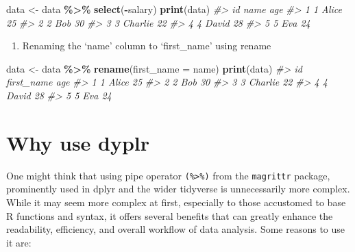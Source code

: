 \documentclass[
]{book}
\newenvironment{Shaded}{\begin{snugshade}}{\end{snugshade}}
\newcommand{\AttributeTok}[1]{\textcolor[rgb]{0.13,0.29,0.53}{#1}}
\newcommand{\CommentTok}[1]{\textcolor[rgb]{0.56,0.35,0.01}{\textit{#1}}}
\newcommand{\FunctionTok}[1]{\textcolor[rgb]{0.13,0.29,0.53}{\textbf{#1}}}
\newcommand{\NormalTok}[1]{#1}
\newcommand{\OtherTok}[1]{\textcolor[rgb]{0.56,0.35,0.01}{#1}}
\newcommand{\SpecialCharTok}[1]{\textcolor[rgb]{0.81,0.36,0.00}{\textbf{#1}}}
\providecommand{\tightlist}{%
  \setlength{\itemsep}{0pt}\setlength{\parskip}{0pt}}
\begin{document}
\begin{Shaded}
\begin{Highlighting}[]
\NormalTok{data }\OtherTok{\textless{}{-}}\NormalTok{ data }\SpecialCharTok{\%\textgreater{}\%}
  \FunctionTok{select}\NormalTok{(}\SpecialCharTok{{-}}\NormalTok{salary)}
\FunctionTok{print}\NormalTok{(data)}
\CommentTok{\#\textgreater{}   id    name age}
\CommentTok{\#\textgreater{} 1  1   Alice  25}
\CommentTok{\#\textgreater{} 2  2     Bob  30}
\CommentTok{\#\textgreater{} 3  3 Charlie  22}
\CommentTok{\#\textgreater{} 4  4   David  28}
\CommentTok{\#\textgreater{} 5  5     Eva  24}
\end{Highlighting}
\end{Shaded}

\begin{enumerate}
\def\labelenumi{\arabic{enumi}.}
\setcounter{enumi}{2}
\tightlist
\item
  Renaming the `name' column to `first\_name' using rename
\end{enumerate}

\begin{Shaded}
\begin{Highlighting}[]
\NormalTok{data }\OtherTok{\textless{}{-}}\NormalTok{ data }\SpecialCharTok{\%\textgreater{}\%}
  \FunctionTok{rename}\NormalTok{(}\AttributeTok{first\_name =}\NormalTok{ name)}
\FunctionTok{print}\NormalTok{(data)}
\CommentTok{\#\textgreater{}   id first\_name age}
\CommentTok{\#\textgreater{} 1  1      Alice  25}
\CommentTok{\#\textgreater{} 2  2        Bob  30}
\CommentTok{\#\textgreater{} 3  3    Charlie  22}
\CommentTok{\#\textgreater{} 4  4      David  28}
\CommentTok{\#\textgreater{} 5  5        Eva  24}
\end{Highlighting}
\end{Shaded}

\section*{Why use dyplr}\label{why-use-dyplr}

One might think that using pipe operator \texttt{(\%\textgreater{}\%)} from the \texttt{magrittr} package, prominently used in dplyr and the wider tidyverse is unnecessarily more complex. While it may seem more complex at first, especially to those accustomed to base R functions and syntax, it offers several benefits that can greatly enhance the readability, efficiency, and overall workflow of data analysis. Some reasons to use it are:
\end{document}
